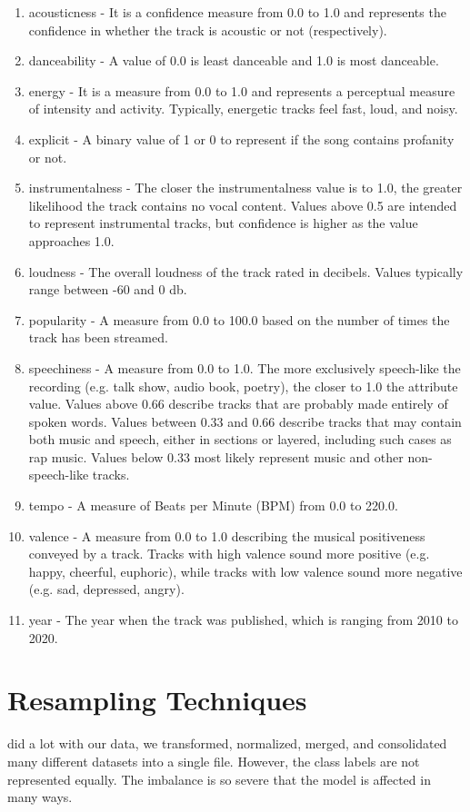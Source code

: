 \documentclass[12pt,journal]{IEEEtran}
\begin{document}
\begin{enumerate}
	\item acousticness - It is a confidence measure from 0.0 to 1.0  and represents the confidence in whether the track is acoustic or not (respectively).
	\item danceability - A value of 0.0 is least danceable and 1.0 is most danceable.
	\item energy - It is a measure from 0.0 to 1.0 and represents a perceptual measure of intensity and activity. Typically, energetic tracks feel fast, loud, and noisy.
	\item explicit - A binary value of 1 or 0 to represent if the song contains profanity or not.
	\item instrumentalness - The closer the instrumentalness value is to 1.0, the greater likelihood the track contains no vocal content. Values above 0.5 are intended to represent instrumental tracks, but confidence is higher as the value approaches 1.0.
	\item loudness - The overall loudness of the track rated in decibels. Values typically range between -60 and 0 db.
	\item popularity - A measure from 0.0 to 100.0 based on the number of times the track has been streamed.
	\item speechiness - A measure from 0.0 to 1.0. The more exclusively speech-like the recording (e.g. talk show, audio book, poetry), the closer to 1.0 the attribute value. Values above 0.66 describe tracks that are probably made entirely of spoken words. Values between 0.33 and 0.66 describe tracks that may contain both music and speech, either in sections or layered, including such cases as rap music. Values below 0.33 most likely represent music and other non-speech-like tracks.
	\item tempo - A measure of Beats per Minute (BPM) from 0.0 to 220.0.
	\item valence - A measure from 0.0 to 1.0 describing the musical positiveness conveyed by a track. Tracks with high valence sound more positive (e.g. happy, cheerful, euphoric), while tracks with low valence sound more negative (e.g. sad, depressed, angry).
	\item year - The year when the track was published, which is ranging from 2010 to 2020.

\end{enumerate}

\section{Resampling Techniques}
 did a lot with our data, we transformed, normalized, merged, and consolidated many different datasets into a single file. However, the class labels are not represented equally. The imbalance is so severe that the model is affected in many ways.
\end{document}
